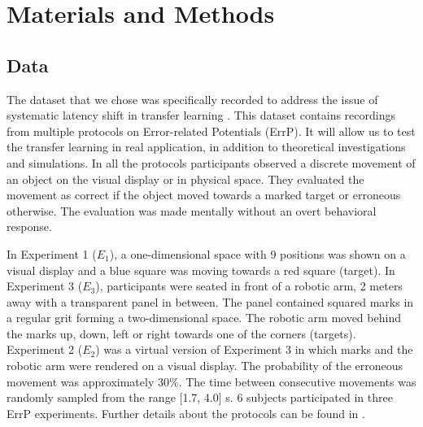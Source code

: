 \documentclass[12pt]{iopart}
\begin{document}





\section{Materials and Methods}
\label{sec:methods}
\subsection{Data}

The dataset that we chose was specifically recorded to address 
the issue of systematic latency shift in transfer learning \cite{iturrate_latency_2014-1}.
This dataset contains recordings from multiple protocols
on Error-related Potentials (ErrP). It will allow us to test
the transfer learning in real application, in addition to theoretical
investigations and simulations.
In all the protocols participants observed a discrete movement of an object
on the visual display or in physical space.
They evaluated the movement as correct if the object moved towards a marked target or erroneous 
otherwise. The evaluation was made mentally without an overt behavioral response.

In Experiment 1 ($E_1$), a one-dimensional space with 9 positions was shown on a visual display and
a blue square was moving towards a red square (target). In Experiment 3 ($E_3$), participants were seated
in front of a robotic arm, 2 meters away with a transparent panel in between.
The panel contained squared marks in a regular grit forming a two-dimensional space.
The robotic arm moved behind the marks up, down, left or right 
towards one of the corners (targets).
Experiment 2 ($E_2$) was a virtual version of Experiment 3 in which marks and the robotic arm
were rendered on a visual display.
The probability of the erroneous
movement was approximately 30\%. The time between consecutive movements was randomly sampled
from the range [1.7, 4.0] s. 
6 subjects participated in three ErrP experiments.
Further details about the protocols can be found in \cite{iturrate_latency_2014-1}.
\end{document}

